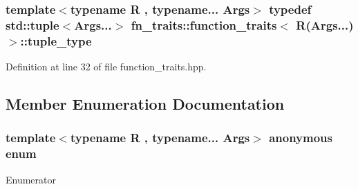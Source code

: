 \subsubsection[{\texorpdfstring{tuple\+\_\+type}{tuple_type}}]{\setlength{\rightskip}{0pt plus 5cm}template$<$typename R , typename... Args$>$ typedef std\+::tuple$<$Args...$>$ {\bf fn\+\_\+traits\+::function\+\_\+traits}$<$ R(Args...)$>$\+::{\bf tuple\+\_\+type}\hspace{0.3cm}{\ttfamily [inherited]}}\hypertarget{structfn__traits_1_1function__traits_3_01_r_07_args_8_8_8_08_4_a9b60ae8c79e52addf352e4ae7c8077b4}{}\label{structfn__traits_1_1function__traits_3_01_r_07_args_8_8_8_08_4_a9b60ae8c79e52addf352e4ae7c8077b4}


Definition at line 32 of file function\+\_\+traits.\+hpp.



\subsection{Member Enumeration Documentation}
\subsubsection[{\texorpdfstring{anonymous enum}{anonymous enum}}]{\setlength{\rightskip}{0pt plus 5cm}template$<$typename R , typename... Args$>$ anonymous enum\hspace{0.3cm}{\ttfamily [inherited]}}\hypertarget{structfn__traits_1_1function__traits_3_01_r_07_args_8_8_8_08_4_aafde9521d9646c97b984646d8273dd3b}{}\label{structfn__traits_1_1function__traits_3_01_r_07_args_8_8_8_08_4_aafde9521d9646c97b984646d8273dd3b}
\begin{Desc}
\item[Enumerator]\par
\begin{description}
\item[{\em 
arity\hypertarget{structfn__traits_1_1function__traits_3_01_r_07_args_8_8_8_08_4_aafde9521d9646c97b984646d8273dd3ba2f612b5524050ab8d6ab3d54d52dbbb0}{}\label{structfn__traits_1_1function__traits_3_01_r_07_args_8_8_8_08_4_aafde9521d9646c97b984646d8273dd3ba2f612b5524050ab8d6ab3d54d52dbbb0}
}]\end{description}
\end{Desc}


